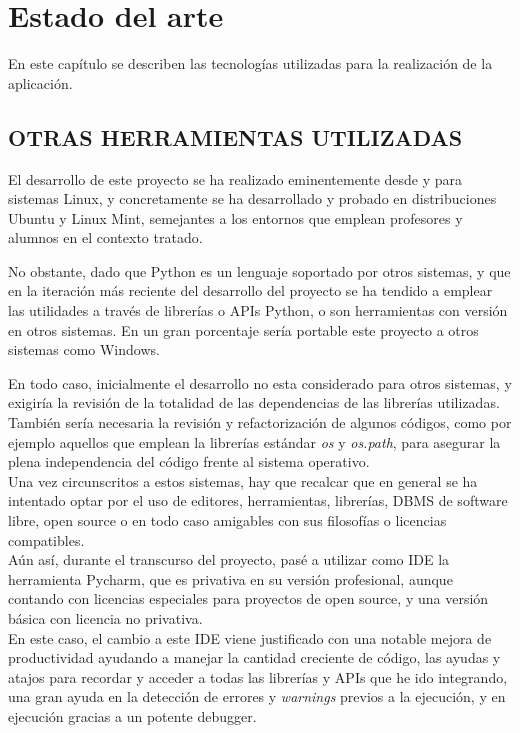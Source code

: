 \cleardoublepage
\chapter{Estado del arte}


En este capítulo se describen las tecnologías utilizadas para la realización de la aplicación.

\section{OTRAS HERRAMIENTAS UTILIZADAS} 
\label{sec:otras_herramientas}

El desarrollo de este proyecto se ha realizado eminentemente desde y para sistemas Linux, y concretamente se ha desarrollado y probado en distribuciones Ubuntu y Linux Mint, semejantes a los entornos que emplean profesores y alumnos en el contexto tratado.

No obstante, dado que Python es un lenguaje soportado por otros sistemas, y que en la iteración más reciente del desarrollo del proyecto se ha tendido a emplear las utilidades a través de librerías o APIs Python, o son herramientas con versión en otros sistemas. En un gran porcentaje sería portable este proyecto a otros sistemas como Windows.

En todo caso, inicialmente el desarrollo no esta considerado para otros sistemas, y exigiría la revisión de la totalidad de las dependencias de las librerías utilizadas. También sería necesaria la revisión y refactorización de algunos códigos, como por ejemplo  aquellos que emplean la librerías estándar \textit{os} y \textit{os.path}, para asegurar la plena independencia del código frente al sistema operativo.\\


Una vez circunscritos a estos sistemas, hay que recalcar que en general se ha intentado optar por el uso de editores, herramientas, librerías, DBMS de software libre, open source o en todo caso amigables con sus filosofías o licencias compatibles.\\


Aún así, durante el transcurso del proyecto, pasé a utilizar como IDE la herramienta Pycharm, que es privativa en su versión profesional, aunque contando con licencias especiales para proyectos de open source, y una versión básica con licencia no privativa.\\


En este caso, el cambio a este IDE viene justificado con una notable mejora de productividad ayudando a manejar la cantidad creciente de código, las ayudas y atajos para recordar y acceder a todas las librerías y APIs que he ido integrando, una gran ayuda en la detección de errores y \textit{warnings} previos a la ejecución, y en ejecución gracias a un potente debugger.\\


